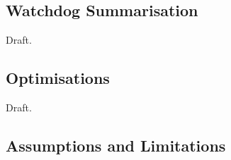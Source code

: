 \subsection{Watchdog Summarisation}
\label{tech:summarisation}

Draft.

\subsection{Optimisations}
\label{tech:optimisations}

Draft.

\subsection{Assumptions and Limitations}
\label{tech:limitations}

